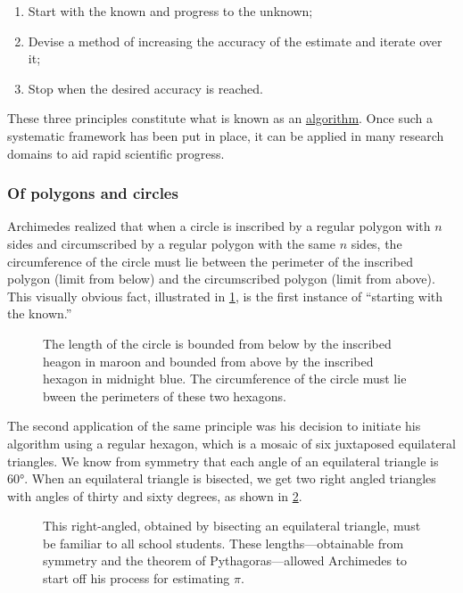 \documentclass[
  a4paper,
]{article}
\begin{document}
\begin{enumerate}
\item
  Start with the known and progress to the unknown;
\item
  Devise a method of increasing the accuracy of the estimate and iterate
  over it;
\item
  Stop when the desired accuracy is reached.
\end{enumerate}

These three principles constitute what is known as an
\href{https://www.merriam-webster.com/dictionary/algorithm}{algorithm}.
Once such a systematic framework has been put in place, it can be
applied in many research domains to aid rapid scientific progress.

\subsubsection{Of polygons and circles}\label{of-polygons-and-circles}

Archimedes realized that when a circle is inscribed by a regular polygon
with \(n\) sides and circumscribed by a regular polygon with the same
\(n\) sides, the circumference of the circle must lie between the
perimeter of the inscribed polygon (limit from below) and the
circumscribed polygon (limit from above). This visually obvious fact,
illustrated in \cref{fig:bounds}, is the first instance of ``starting
with the known.''

\begin{figure}
\centering

\caption{The length of the circle is bounded from below by the inscribed
heagon in maroon and bounded from above by the inscribed hexagon in
midnight blue. The circumference of the circle must lie bween the
perimeters of these two hexagons.}\label{fig:bounds}
\end{figure}

The second application of the same principle was his decision to
initiate his algorithm using a regular hexagon, which is a mosaic of six
juxtaposed equilateral triangles. We know from symmetry that each angle
of an equilateral triangle is \(60°\). When an equilateral triangle is
bisected, we get two right angled triangles with angles of thirty and
sixty degrees, as shown in \cref{fig:thirty-sixty}.

\begin{figure}
\centering

\caption{This right-angled, obtained by bisecting an equilateral
triangle, must be familiar to all school students. These
lengths---obtainable from symmetry and the theorem of
Pythagoras---allowed Archimedes to start off his process for estimating
\(\pi\).}\label{fig:thirty-sixty}
\end{figure}
\end{document}
